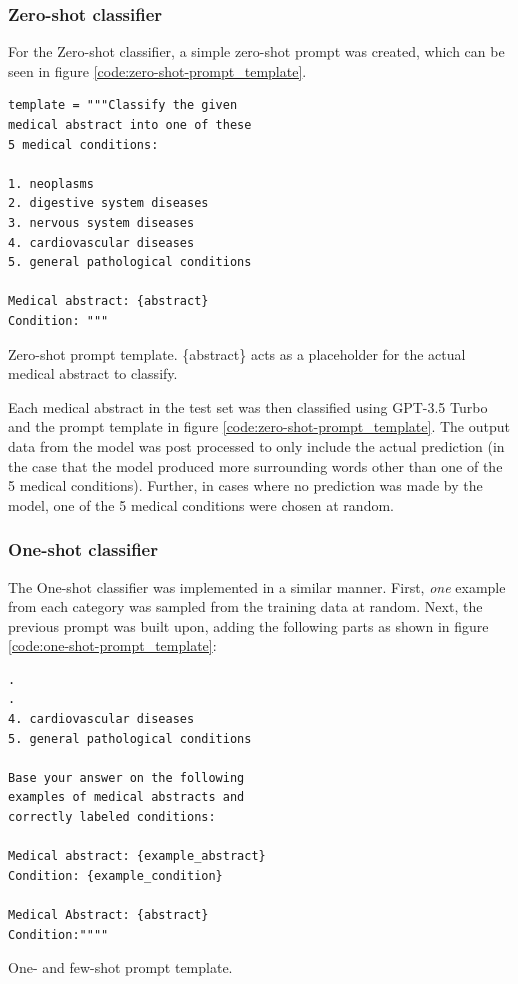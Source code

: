 \subsubsection{Zero-shot classifier}

For the Zero-shot classifier, a simple zero-shot prompt was created, which can be seen in figure \ref{code:zero-shot-prompt_template}.

\begin{Verbatim}[frame=single, framesep=3mm, framerule=0.5pt, rulecolor=\color{black}]
template = """Classify the given 
medical abstract into one of these
5 medical conditions:

1. neoplasms
2. digestive system diseases
3. nervous system diseases
4. cardiovascular diseases
5. general pathological conditions

Medical abstract: {abstract}
Condition: """
\end{Verbatim}
\vspace{-1.5em}
\captionsetup{type=figure}
\caption{Zero-shot prompt template. \{abstract\} acts as a placeholder for the actual medical abstract to classify.}
\label{code:zero-shot-prompt_template}
\vspace{1em}

Each medical abstract in the test set was then classified using GPT-3.5 Turbo and the prompt template in figure \ref{code:zero-shot-prompt_template}. The output data from the model was post processed to only include the actual prediction (in the case that the model produced more surrounding words other than one of the 5 medical conditions). Further, in cases where no prediction was made by the model, one of the 5 medical conditions were chosen at random.

\subsubsection{One-shot classifier}

The One-shot classifier was implemented in a similar manner. First, \textit{one} example from each category was sampled from the training data at random. Next, the previous prompt was built upon, adding the following parts as shown in figure \ref{code:one-shot-prompt_template}:

\begin{Verbatim}[frame=single, framesep=3mm, framerule=0.5pt, rulecolor=\color{black}]
.
.
4. cardiovascular diseases
5. general pathological conditions

Base your answer on the following 
examples of medical abstracts and 
correctly labeled conditions:

Medical abstract: {example_abstract}
Condition: {example_condition}

Medical Abstract: {abstract}
Condition:""""
\end{Verbatim}
\vspace{-1.5em}
\captionsetup{type=figure}
\caption{One- and few-shot prompt template.}
\label{code:one-shot-prompt_template}
\vspace{1em}

